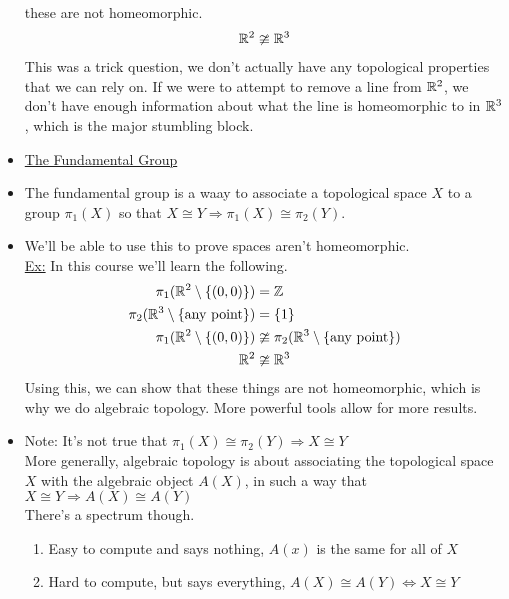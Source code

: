 \documentclass[../notes.tex]{subfiles}
\begin{document}
\begin{itemize}
            these are not homeomorphic.
            \begin{align*}
                \mathbb{R}^2 \ncong \mathbb{R}^3\\
            \end{align*}
            This was a trick question, we don't actually have any topological properties that we can rely on. If we were
            to attempt to remove a line from $\mathbb{R}^2$, we don't have enough information about what the line is homeomorphic to
            in $\mathbb{R}^3$, which is the major stumbling block.
        \item\underline{The Fundamental Group}
        \item The fundamental group is a waay to associate a topological space $X$ to a group $\pi_1(X)$ so that
            $X\cong Y \Rightarrow \pi_1(X)\cong\pi_2(Y)$. 
        \item We'll be able to use this to prove spaces aren't homeomorphic.\\
            \underline{Ex:} In this course we'll learn the following.
            \begin{align*}
                \pi_1(\mathbb{R}^2\setminus\{(0,0)\})&=\mathbb{Z}\\
                \pi_2(\mathbb{R}^3\setminus\{\text{any point}\})&=\{1\}\\
                \pi_1(\mathbb{R}^2\setminus\{(0,0)\})&\ncong \pi_2(\mathbb{R}^3\setminus\{\text{any point}\})\\
                \mathbb{R}^2&\ncong\mathbb{R}^3\\
            \end{align*}
            Using this, we can show that these things are not homeomorphic, which is why we do algebraic topology.
            More powerful tools allow for more results.
        \item Note: It's not true that $\pi_1(X)\cong \pi_2(Y)\Rightarrow X\cong Y$\\
            More generally, algebraic topology is about associating the topological space $X$ 
            with the algebraic object $A(X)$, in such a way that $X\cong Y \Rightarrow A(X)\cong A(Y)$\\
            There's a spectrum though.
            \begin{enumerate}
                \item Easy to compute and says nothing, $A(x)$ is the same for all of $X$
                \item Hard to compute, but says everything, $A(X)\cong A(Y) \iff X\cong Y$
            \end{enumerate}
    \end{itemize}
\end{document}
